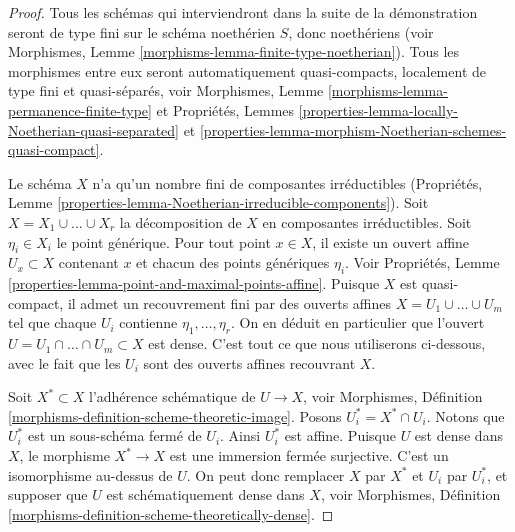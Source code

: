 \begin{proof}
Tous les schémas qui interviendront dans la suite de la démonstration
seront de type fini sur le schéma noethérien $S$, donc
noethériens
(voir Morphismes, Lemme \ref{morphisms-lemma-finite-type-noetherian}).
Tous les morphismes entre eux seront automatiquement quasi-compacts,
localement de type fini et quasi-séparés, voir
Morphismes, Lemme \ref{morphisms-lemma-permanence-finite-type} et
Propriétés,
Lemmes \ref{properties-lemma-locally-Noetherian-quasi-separated} et
\ref{properties-lemma-morphism-Noetherian-schemes-quasi-compact}.

\medskip\noindent
Le schéma $X$ n'a qu'un nombre fini de composantes irréductibles
(Propriétés, Lemme \ref{properties-lemma-Noetherian-irreducible-components}).
Soit $X = X_1 \cup \ldots \cup X_r$ la décomposition
de $X$ en composantes irréductibles.
Soit $\eta_i \in X_i$ le point générique.
Pour tout point $x \in X$, il existe un ouvert affine
$U_x \subset X$ contenant $x$ et chacun des points
génériques $\eta_i$. Voir
Propriétés, Lemme \ref{properties-lemma-point-and-maximal-points-affine}.
Puisque $X$ est quasi-compact, il admet un recouvrement fini
par des ouverts affines $X = U_1 \cup \ldots \cup U_m$ tel que
chaque $U_i$ contienne $\eta_1, \ldots, \eta_r$.
On en déduit en particulier que l'ouvert
$U = U_1 \cap \ldots \cap U_m \subset X$ est
dense. C'est tout ce que nous utiliserons ci-dessous, avec le fait
que les $U_i$ sont des ouverts affines recouvrant $X$.

\medskip\noindent
Soit $X^* \subset X$ l'adhérence schématique de $U \to X$, voir
Morphismes, Définition \ref{morphisms-definition-scheme-theoretic-image}.
Posons $U_i^* = X^* \cap U_i$. Notons que $U_i^*$ est un sous-schéma fermé
de $U_i$. Ainsi $U_i^*$ est affine. Puisque $U$ est dense dans $X$,
le morphisme $X^* \to X$ est une immersion fermée surjective.
C'est un isomorphisme au-dessus de $U$. On peut donc remplacer $X$ par $X^*$
et $U_i$ par $U_i^*$, et supposer que $U$ est schématiquement dense
dans $X$, voir
Morphismes, Définition \ref{morphisms-definition-scheme-theoretically-dense}.


\end{proof}
